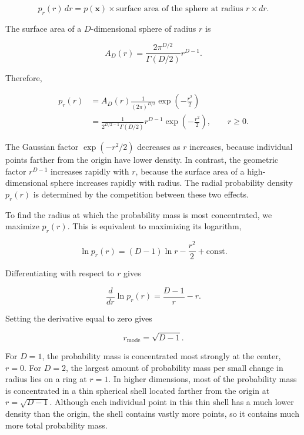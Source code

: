 \documentclass[10pt,twocolumn]{memoir}
\begin{document}
\begin{equation}
    p_r(r)\,dr = p(\mathbf{x}) \times \text{surface area of the sphere at radius } r \times dr.
\end{equation}

The surface area of a $D$-dimensional sphere of radius $r$ is

\begin{equation}
    A_D(r) = \frac{2\pi^{D/2}}{\Gamma(D/2)} r^{D-1}.
\end{equation}

Therefore,

\begin{align}
    p_r(r)
    &= A_D(r)\frac{1}{(2\pi)^{D/2}}\exp\left(-\frac{r^2}{2}\right) \\
    &= \frac{1}{2^{D/2-1}\Gamma(D/2)}r^{D-1}\exp\left(-\frac{r^2}{2}\right), \qquad r\geq 0.
\end{align}

The Gaussian factor $\exp(-r^2/2)$ decreases as $r$ increases, because individual points farther from the origin have lower density. In contrast, the geometric factor $r^{D-1}$ increases rapidly with $r$, because the surface area of a high-dimensional sphere increases rapidly with radius. The radial probability density $p_r(r)$ is determined by the competition between these two effects.

To find the radius at which the probability mass is most concentrated, we maximize $p_r(r)$. This is equivalent to maximizing its logarithm,

\begin{equation}
    \ln p_r(r) = (D-1)\ln r - \frac{r^2}{2} + \mathrm{const}.
\end{equation}

Differentiating with respect to $r$ gives

\begin{equation}
    \frac{d}{dr}\ln p_r(r) = \frac{D-1}{r} - r.
\end{equation}

Setting the derivative equal to zero gives

\begin{equation}
    r_{\mathrm{mode}} = \sqrt{D-1}.
\end{equation}

For $D=1$, the probability mass is concentrated most strongly at the center, $r=0$. For $D=2$, the largest amount of probability mass per small change in radius lies on a ring at $r=1$. In higher dimensions, most of the probability mass is concentrated in a thin spherical shell located farther from the origin at $r=\sqrt{D-1}$. Although each individual point in this thin shell has a much lower density than the origin, the shell contains vastly more points, so it contains much more total probability mass.
\end{document}

